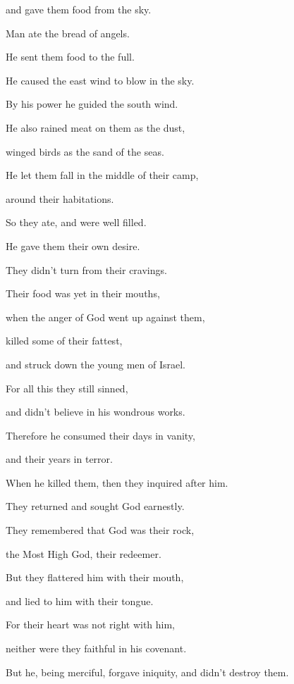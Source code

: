 {\par }{\QB and gave them food from the sky.
\par }{\Q {}Man ate the bread of angels.
\par }{\QB He sent them food to the full.
\par }{\Q {}He caused the east wind to blow in the sky.
\par }{\QB By his power he guided the south wind.
\par }{\Q {}He also rained meat on them as the dust,
\par }{\QB winged birds as the sand of the seas.
\par }{\Q {}He let them fall in the middle of their camp,
\par }{\QB around their habitations.
\par }{\Q {}So they ate, and were well filled.
\par }{\QB He gave them their own desire.
\par }{\Q {}They didn’t turn from their cravings.
\par }{\QB Their food was yet in their mouths,
\par }{\QB {}when the anger of God went up against them,
\par }{\QB killed some of their fattest,
\par }{\QB and struck down the young men of Israel.
\par }{\Q {}For all this they still sinned,
\par }{\QB and didn’t believe in his wondrous works.
\par }{\Q {}Therefore he consumed their days in vanity,
\par }{\QB and their years in terror.
\par }{\Q {}When he killed them, then they inquired after him.
\par }{\QB They returned and sought God earnestly.
\par }{\Q {}They remembered that God was their rock,
\par }{\QB the Most High God, their redeemer.
\par }{\Q {}But they flattered him with their mouth,
\par }{\QB and lied to him with their tongue.
\par }{\Q {}For their heart was not right with him,
\par }{\QB neither were they faithful in his covenant.
\par }{\Q {}But he, being merciful, forgave iniquity, and didn’t destroy them.
}
